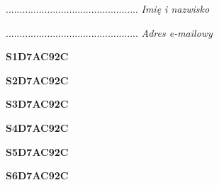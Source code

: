 \begin{turn}{90}\begin{minipage}{\linewidth} \vspace{20mm} ................................................  \textit{Imię i nazwisko}\end{minipage}\end{turn}

\begin{turn}{90}\begin{minipage}{\linewidth} \vspace{20mm} ................................................  \textit{Adres e-mailowy}\end{minipage}\end{turn}

\begin{turn}{90}\huge \begin{minipage}{\linewidth} \vspace{10mm}\textbf{S1D7AC92C}\end{minipage}\end{turn}

\begin{turn}{90}\huge \begin{minipage}{\linewidth} \vspace{10mm}\textbf{S2D7AC92C}\end{minipage}\end{turn}

\begin{turn}{90}\huge \begin{minipage}{\linewidth} \vspace{10mm}\textbf{S3D7AC92C}\end{minipage}\end{turn}

\begin{turn}{90}\huge \begin{minipage}{\linewidth} \vspace{10mm}\textbf{S4D7AC92C}\end{minipage}\end{turn}

\begin{turn}{90}\huge \begin{minipage}{\linewidth} \vspace{10mm}\textbf{S5D7AC92C}\end{minipage}\end{turn}

\begin{turn}{90}\huge \begin{minipage}{\linewidth} \vspace{10mm}\textbf{S6D7AC92C}\end{minipage}\end{turn}

